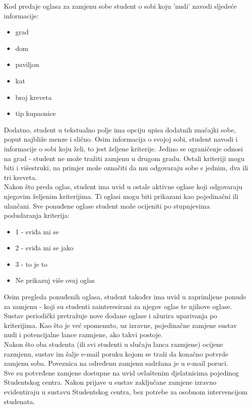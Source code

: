 		Kod predaje oglasa za zamjenu sobe student o sobi koju 'nudi' navodi sljedeće informacije:
		\begin{itemize}
			\item grad
			\item dom
			\item paviljon
			\item kat
			\item broj kreveta 
			\item tip kupaonice
		\end{itemize}
		Dodatno, student u tekstualno polje ima opciju upisa dodatnih značajki sobe, poput najbliže menze i slično. Osim informacija o svojoj sobi, student navodi i informacije o sobi koju želi, to jest željene kriterije. Jedino se ograničenje odnosi na grad - student ne može tražiti zamjenu u drugom gradu. Ostali kriteriji mogu biti i višestruki, na primjer može označiti da mu odgovaraju sobe s jednim, dva ili tri kreveta.\\
		Nakon što preda oglas, student ima uvid u ostale aktivne oglase koji odgovaraju njegovim željenim kriterijima. Ti oglasi mogu biti prikazani kao pojedinačni ili ulančani. Sve ponuđene oglase student može ocijeniti po stupnjevima podudaranja kriterija:
		\begin{itemize}
			\item 1 - sviđa mi se
			\item 2 - sviđa mi se jako
			\item 3 - to je to
			\item Ne prikazuj više ovaj oglas
		\end{itemize} 
		Osim pregleda ponuđenih oglasa, student također ima uvid u zaprimljene ponude za zamjenu - koji su studenti zainteresirani za njegov oglas te njihove oglase.\\
		Sustav periodički pretražuje nove dodane oglase i ažurira uparivanja po kriterijima. Kao što je već spomenuto, uz izravne, pojedinačne zamjene sustav nudi i potencijalne lance razmjene, ako takvi postoje.\\
		Nakon što oba studenta (ili svi studenti u slučaju lanca razmjene) ocijene razmjenu, sustav im šalje e-mail poruku kojom se traži da konačno potvrde zamjenu soba. Poveznica na određenu zamjenu sadržana je u e-mail poruci. \\
		Sve su potvrđene zamjene dostupne na uvid ovlaštenim djelatnicima pojedinog Studentskog centra. Nakon prijave u sustav zaključane zamjene izravno evidentiraju u sustavu Studentskog centra, bez potrebe za osobnom intervencijom studenata.
		
